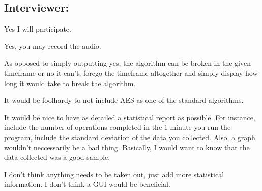 \subsection{Interviewer: \md}


\begin{answer}{1}
Yes I will participate.
\end{answer}


\begin{answer}{2}
Yes, you may record the audio.
\end{answer}


\begin{answer}{3}
As opposed to simply outputting yes, the algorithm can be
broken in the given timeframe or no it can't, forego the
timeframe altogether and simply display how long it would
take to break the algorithm.
\end{answer}


\begin{answer}{4}
It would be foolhardy to not include AES as one of the
standard algorithms.
\end{answer}


\begin{answer}{5}
It would be nice to have as detailed a statistical report
as possible. For instance, include the number of operations
completed in the 1 minute you run the program, include the
standard deviation of the data you collected. Also, a graph
wouldn't neccessarily be a bad thing. Basically, I would want
to know that the data collected was a good sample.
\end{answer}


\begin{answer}{6}
I don't think anything needs to be taken out, just add more
statistical information. I don't think a GUI would be
beneficial.
\end{answer}

